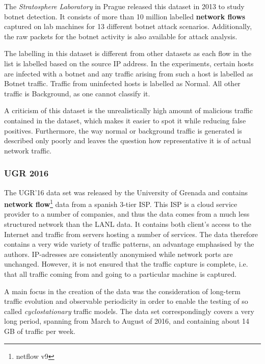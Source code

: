 \documentclass[a4paper,12pt,twoside]{report}
\begin{document}
The \textit{Stratosphere Laboratory} in Prague released this dataset in 2013 to study botnet detection. It consists of more than 10 million labelled \textbf{network flows} captured on lab machines for 13 different botnet attack scenarios. Additionally, the raw packets for the botnet activity is also available for attack analysis. 

The labelling in this dataset is different from other datasets as each  flow  in  the  list  is  labelled  based  on  the  source  IP  address.  In  the experiments,  certain  hosts  are  infected  with  a  botnet  and  any  traffic  arising from such a host is labelled as Botnet traffic. Traffic from uninfected hosts is labelled as Normal. All other traffic is Background, as one cannot classify it. 

A criticism of this dataset is the unrealistically high amount of malicious traffic contained in the dataset, which makes it easier to spot it while reducing false positives. Furthermore, the way normal or background traffic is generated is described only poorly and leaves the question how representative it is of actual network traffic.

\subsubsection*{UGR 2016 \cite{macia2018ugr}}

The UGR'16 data set was released by the University of Grenada and contains \textbf{network flow}\footnote{netflow v9} data from a spanish 3-tier ISP. This ISP is a cloud service provider to a number of companies, and thus the data comes from a much less structured network than the LANL data. It contains both client's access to the Internet and traffic from servers hosting a number of services. The data therefore contains a very wide variety of traffic patterns, an advantage emphasised by the authors. IP-adresses are consistently anonymised while network ports are unchanged. However, it is not ensured that the traffic capture is complete, i.e. that all traffic coming from and going to a particular machine is captured.

A main focus in the creation of the data was the consideration of long-term traffic evolution and observable periodicity in order to enable the testing of so called \textit{cyclostationary} traffic models. The data set correspondingly covers a very long period, spanning from March to August of 2016, and containing about 14 GB of traffic per week. 
\end{document}
